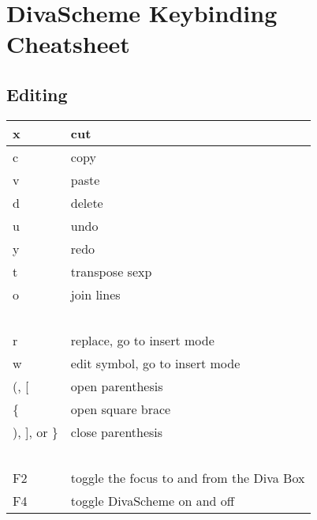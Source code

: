 \documentclass[landscape,letterpaper]{article}
\begin{document}
\pagestyle{empty}

\section*{DivaScheme Keybinding Cheatsheet}

\begin{multicols}{2}

\subsection*{Editing}
\begin{tabular}{|l|l|} \hline
       x &           cut \\ \hline
       c    &        copy \\ \hline
       v       &     paste \\ \hline
       d         &   delete \\ \hline
       u           & undo \\ \hline
       y            &redo \\ \hline
       t            & transpose sexp \\ \hline
       o            & join lines \\ \hline
        ~ & ~ \\ \hline 
       r            & replace, go to insert mode \\ \hline
       w            & edit symbol, go to insert mode \\ \hline       
    (, [            & open parenthesis \\ \hline
       \{   & open square brace \\ \hline
    ), ], or \} &           close parenthesis \\ \hline
        ~ & ~ \\ \hline 
       F2     &      toggle the focus to and from the Diva Box  \\ \hline
       F4     &     toggle DivaScheme on and off \\  \hline
\end{tabular}    

~ \\
  

\end{multicols}
\end{document}
